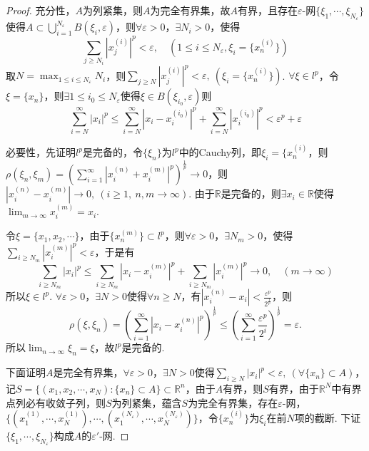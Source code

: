 \documentclass[12pt, a4paper, oneside]{ctexart}
\let\leq=\leqslant %
\let\geq=\geqslant %
\def\R{\mathbb{R}}          %
\begin{document}
\begin{proof}
    充分性，$A$为列紧集，则$A$为完全有界集，故$A$有界，且存在$\varepsilon$-网$\{\xi_1,\cdots, \xi_{N_{\varepsilon}}\}$使得$A\subset \bigcup_{i=1}^{N_{\varepsilon}}B(\xi_i,\varepsilon)$，则$\forall \varepsilon > 0$，$\exists N_i > 0$，使得
    \begin{equation*}
        \sum_{j\geq N_i}|x_j^{(i)}|^p < \varepsilon,\quad(1\leq i\leq N_\varepsilon, \xi_i=\{x_n^{(i)}\})
    \end{equation*}
    取$N = \max_{1\leq i\leq N_\varepsilon}N_i$，则$\sum_{j\geq N}|x_j^{(i)}|^p < \varepsilon,\ (\xi_i = \{x_n^{(i)}\})$. $\forall \xi\in l^p$，令$\xi = \{x_n\}$，则$\exists 1\leq i_0\leq N_\varepsilon$使得$\xi\in B(\xi_{i_0},\varepsilon)$则
    \begin{equation*}
        \sum_{i=N}^\infty |x_i|^p\leq \sum_{i=N}^\infty |x_i-x_i^{(i_0)}|^p + \sum_{i=N}^\infty |x_i^{(i_0)}|^p < \varepsilon^p + \varepsilon
    \end{equation*}
    
    必要性，先证明$l^p$是完备的，令$\{\xi_n\}$为$l^p$中的Cauchy列，即$\xi_i = \{x_n^{(i)}$，则$\rho(\xi_n,\xi_m) = \left(\sum_{i=1}^\infty|x_i^{(n)}+x_i^{(m)}|^p\right)^{\frac{1}{p}} \to 0$，则$|x_i^{(n)}-x_i^{(m)}|\to 0,\ (i\geq 1,\ n,m\to \infty)$. 由于$\R$是完备的，则$\exists x_i\in \R$使得$\lim_{m\to\infty}x_i^{(m)} = x_i$.
    
    令$\xi = \{x_1,x_2,\cdots\}$，由于$\{x_n^{(m)}\}\subset l^p$，则$\forall \varepsilon > 0$，$\exists N_m > 0$，使得$\sum_{i\geq N_m}|x_i^{(m)}|^p < \varepsilon$，于是有
    \begin{equation*}
        \sum_{i\geq N_m}|x_i|^p\leq \sum_{i\geq N_m}|x_i-x_i^{(m)}|^p+\sum_{i\geq N_m}|x_i^{(m)}|^p \to 0,\quad(m\to\infty)
    \end{equation*}
    所以$\xi\in l^p$. $\forall \varepsilon > 0$，$\exists N > 0$使得$\forall n \geq N$，有$|x_i^{(n)}-x_i| < \frac{\varepsilon^p}{2^{\frac{1}{p}}}$，则
    \begin{equation*}
        \rho(\xi,\xi_n)=\left(\sum_{i=1}^\infty|x_i-x_i^{(n)}|^p\right)^{\frac{1}{p}}\leq \left(\sum_{i=1}^\infty\frac{\varepsilon^p}{2^i}\right)^{\frac{1}{p}} = \varepsilon.
    \end{equation*}
    所以$\lim_{n\to\infty}\xi_n=\xi$，故$l^p$是完备的.

    下面证明$A$是完全有界集，$\forall \varepsilon > 0$，$\exists N > 0$使得$\sum_{i\geq N}|x_i|^p < \varepsilon,\ (\forall \{x_n\}\subset A)$，记$S=\{(x_1,x_2,\cdots, x_N):\{x_n\}\subset A\}\subset \R^n$，由于$A$有界，则$S$有界，由于$\R^N$中有界点列必有收敛子列，则$S$为列紧集，蕴含$S$为完全有界集，存在$\varepsilon$-网，$\{(x_1^{(1)}, \cdots, x_N^{(1)}),\cdots, (x_1^{(N_\varepsilon)},\cdots,x_N^{(N_\varepsilon)})\}$，令$\{x_n^{(i)}\}$为$\xi_i$在前$N$项的截断. 下证$\{\xi_1,\cdots, \xi_{N_\varepsilon}\}$构成$A$的$\varepsilon'$-网.


\end{proof}
\end{document}
